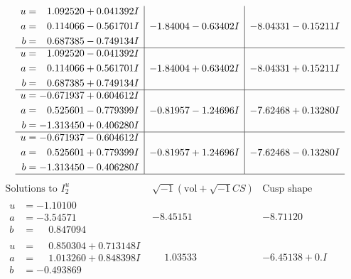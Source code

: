\documentclass[1p]{elsarticle_modified}
\theoremstyle{definition}
\newcommand{\I}{\sqrt{-1}}
\begin{document}
$$\begin{array}{c|c|c}
\begin{aligned}
u &= \phantom{-}1.092520 + 0.041392 I \\
a &= \phantom{-}0.114066 - 0.561701 I \\
b &= \phantom{-}0.687385 - 0.749134 I\end{aligned}
 & -1.84004 - 0.63402 I & -8.04331 - 0.15211 I \\ \hline\begin{aligned}
u &= \phantom{-}1.092520 - 0.041392 I \\
a &= \phantom{-}0.114066 + 0.561701 I \\
b &= \phantom{-}0.687385 + 0.749134 I\end{aligned}
 & -1.84004 + 0.63402 I & -8.04331 + 0.15211 I \\ \hline\begin{aligned}
u &= -0.671937 + 0.604612 I \\
a &= \phantom{-}0.525601 - 0.779399 I \\
b &= -1.313450 + 0.406280 I\end{aligned}
 & -0.81957 - 1.24696 I & -7.62468 + 0.13280 I \\ \hline\begin{aligned}
u &= -0.671937 - 0.604612 I \\
a &= \phantom{-}0.525601 + 0.779399 I \\
b &= -1.313450 - 0.406280 I\end{aligned}
 & -0.81957 + 1.24696 I & -7.62468 - 0.13280 I\\
 \hline 
 \end{array}$$\newpage$$\begin{array}{c|c|c}  
\text{Solutions to }I^u_{2}& \I (\text{vol} + \sqrt{-1}CS) & \text{Cusp shape}\\
 \hline 
\begin{aligned}
u &= -1.10100\phantom{ +0.000000I} \\
a &= -3.54571\phantom{ +0.000000I} \\
b &= \phantom{-}0.847094\phantom{ +0.000000I}\end{aligned}
 & -8.45151\phantom{ +0.000000I} & -8.71120\phantom{ +0.000000I} \\ \hline\begin{aligned}
u &= \phantom{-}0.850304 + 0.713148 I \\
a &= \phantom{-}1.013260 + 0.848398 I \\
b &= -0.493869\phantom{ +0.000000I}\end{aligned}
 & \phantom{-}1.03533\phantom{ +0.000000I} & -6.45138 + 0. I\phantom{ +0.000000I} \\ \hline\begin{aligned}

\end{aligned}
\end{array}$$
\end{document}
